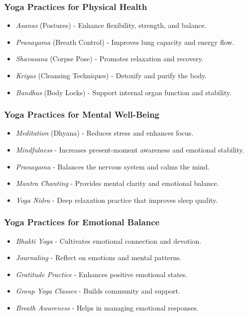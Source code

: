 \begin{frame}[fragile]\frametitle{Yoga Practices for Physical Health}

      \begin{itemize}
		\item \textit{Asanas} (Postures) - Enhance flexibility, strength, and balance.
		\item \textit{Pranayama} (Breath Control) - Improves lung capacity and energy flow.
		\item \textit{Shavasana} (Corpse Pose) - Promotes relaxation and recovery.
		\item \textit{Kriyas} (Cleansing Techniques) - Detoxify and purify the body.
		\item \textit{Bandhas} (Body Locks) - Support internal organ function and stability.
	  \end{itemize}

\end{frame}

\begin{frame}[fragile]\frametitle{Yoga Practices for Mental Well-Being}

      \begin{itemize}
		\item \textit{Meditation} (Dhyana) - Reduces stress and enhances focus.
		\item \textit{Mindfulness} - Increases present-moment awareness and emotional stability.
		\item \textit{Pranayama} - Balances the nervous system and calms the mind.
		\item \textit{Mantra Chanting} - Provides mental clarity and emotional balance.
		\item \textit{Yoga Nidra} - Deep relaxation practice that improves sleep quality.
	  \end{itemize}

\end{frame}

\begin{frame}[fragile]\frametitle{Yoga Practices for Emotional Balance}

      \begin{itemize}
		\item \textit{Bhakti Yoga} - Cultivates emotional connection and devotion.
		\item \textit{Journaling} - Reflect on emotions and mental patterns.
		\item \textit{Gratitude Practice} - Enhances positive emotional states.
		\item \textit{Group Yoga Classes} - Builds community and support.
		\item \textit{Breath Awareness} - Helps in managing emotional responses.
	  \end{itemize}

\end{frame}

